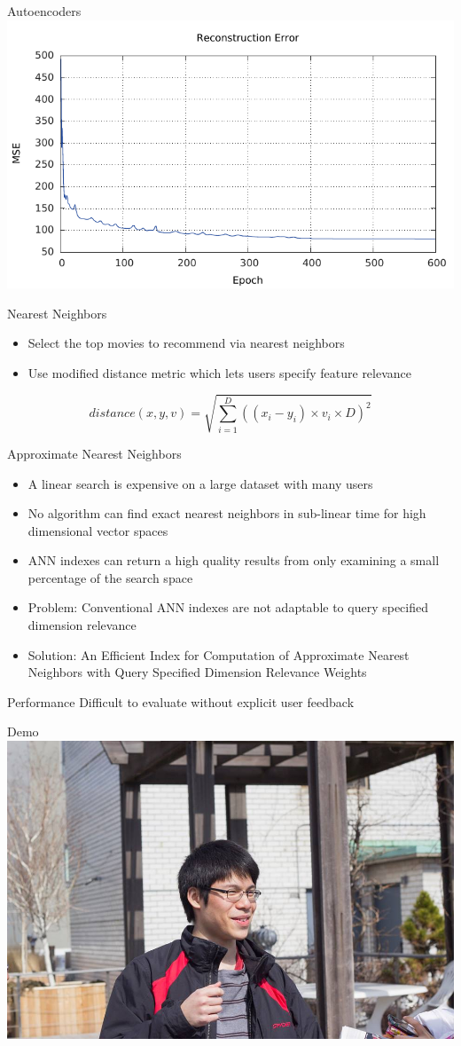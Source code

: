 \documentclass{beamer}
\begin{document}
\begin{frame}{Autoencoders}
\centering
\includegraphics[width=0.8\linewidth]{../paper/error.pdf}
\end{frame}

\begin{frame}{Nearest Neighbors}
\begin{itemize}
\item Select the top movies to recommend via nearest neighbors
\item Use modified distance metric which lets users specify feature relevance
\end{itemize}
\begin{equation}
distance(x,y,v) = \sqrt{\sum\limits_{i=1}^D ((x_i - y_i) \times v_i \times D)^2} 
\end{equation}
\end{frame}

\begin{frame}{Approximate Nearest Neighbors}
\begin{itemize}
\item A linear search is expensive on a large dataset with many users
\item No algorithm can find exact nearest neighbors in sub-linear time for high dimensional vector spaces
\item ANN indexes can return a high quality results from only examining a small percentage of the search space
\item Problem: Conventional ANN indexes are not adaptable to query specified dimension relevance
\item Solution: An Efficient Index for Computation of Approximate Nearest Neighbors with Query Specified Dimension Relevance Weights
\end{itemize}
\end{frame}

\begin{frame}{Performance}
Difficult to evaluate without explicit user feedback
\end{frame}

\begin{frame}{Demo}
\centering
\includegraphics[width=0.6\linewidth]{zhao.jpg}
\end{frame}

\begin{frame}
\titlepage
\end{frame}
\end{document}
